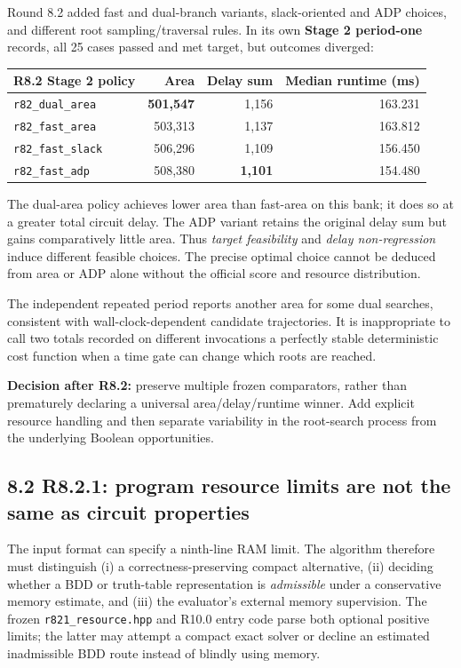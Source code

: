Round 8.2 added fast and dual-branch variants, slack-oriented and ADP choices, and different root sampling/traversal rules. In its own \textbf{Stage 2 period-one} records, all 25 cases passed and met target, but outcomes diverged:

\begin{longtable}[]{@{}lrrr@{}}
\toprule\noalign{}
R8.2 Stage 2 policy & Area & Delay sum & Median runtime (ms) \\
\midrule\noalign{}
\endhead
\bottomrule\noalign{}
\endlastfoot
\texttt{r82\_dual\_area} & \textbf{501,547} & 1,156 & 163.231 \\
\texttt{r82\_fast\_area} & 503,313 & 1,137 & 163.812 \\
\texttt{r82\_fast\_slack} & 506,296 & 1,109 & 156.450 \\
\texttt{r82\_fast\_adp} & 508,380 & \textbf{1,101} & 154.480 \\
\end{longtable}

The dual-area policy achieves lower area than fast-area on this bank; it does so at a greater total circuit delay. The ADP variant retains the original delay sum but gains comparatively little area. Thus \emph{target feasibility} and \emph{delay non-regression} induce different feasible choices. The precise optimal choice cannot be deduced from area or ADP alone without the official score and resource distribution.

The independent repeated period reports another area for some dual searches, consistent with wall-clock-dependent candidate trajectories. It is inappropriate to call two totals recorded on different invocations a perfectly stable deterministic cost function when a time gate can change which roots are reached.

\textbf{Decision after R8.2:} preserve multiple frozen comparators, rather than prematurely declaring a universal area/delay/runtime winner. Add explicit resource handling and then separate variability in the root-search process from the underlying Boolean opportunities.

\subsection{8.2 R8.2.1: program resource limits are not the same as circuit properties}\label{r8.2.1-program-resource-limits-are-not-the-same-as-circuit-properties}

The input format can specify a ninth-line RAM limit. The algorithm therefore must distinguish (i) a correctness-preserving compact alternative, (ii) deciding whether a BDD or truth-table representation is \emph{admissible} under a conservative memory estimate, and (iii) the evaluator's external memory supervision. The frozen \texttt{r821\_resource.hpp} and R10.0 entry code parse both optional positive limits; the latter may attempt a compact exact solver or decline an estimated inadmissible BDD route instead of blindly using memory.

